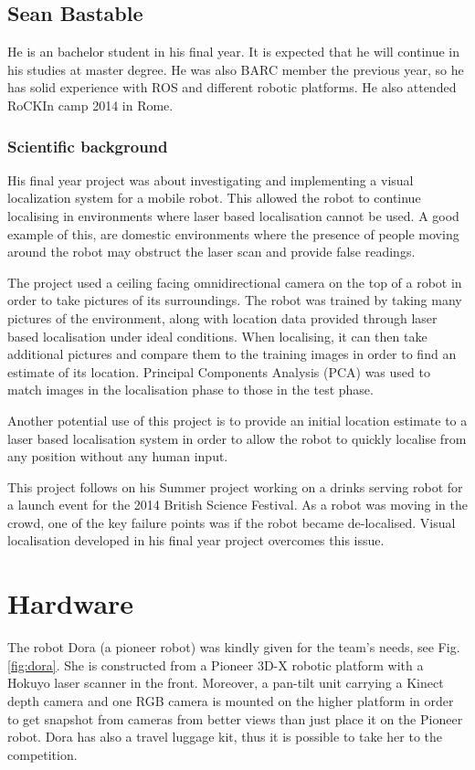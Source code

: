 \documentclass[conference]{IEEEtran}
\begin{document}
\subsection{Sean Bastable}

He is an bachelor student in his final year. It is expected that he will continue in his studies at master degree. He was also BARC member the previous year, so he has solid experience with ROS and different robotic platforms. He also attended RoCKIn camp 2014 in Rome.

\subsubsection*{Scientific background}
 
His final year project was about investigating and implementing a visual localization system for a mobile robot. This allowed the robot to continue localising in environments where laser based localisation cannot be used. A good example of this, are domestic environments where the presence of people moving around the robot may obstruct the laser scan and provide false readings.
 
The project used a ceiling facing omnidirectional camera on the top of a robot in order to take pictures of its surroundings.
The robot was trained by taking many pictures of the environment, along with location data provided through laser based localisation under ideal conditions. When localising, it can then take additional pictures and compare them to the training images in order to find an estimate of its location. Principal Components Analysis (PCA) was used to match images in the localisation phase to those in the test phase. 

Another potential use of this project is to provide an initial location estimate to a laser based localisation system in order to allow the robot to quickly localise from any position without any human input.

This project follows on his Summer project working on a drinks serving robot for a launch event for the 2014 British Science Festival. As a robot was moving in the crowd, one of the key failure points was if the robot became de-localised. Visual localisation developed in his final year project overcomes this issue.

\section{\label{sec:hardware}Hardware}
The robot Dora (a pioneer robot) was kindly given for the team's needs, see Fig.\ref{fig:dora}. She is constructed from a Pioneer 3D-X robotic platform with a Hokuyo laser scanner in the front. Moreover, a pan-tilt unit carrying a Kinect depth camera and one RGB camera
is mounted on the higher platform in order to get snapshot from cameras from better views than just place it on the Pioneer robot. Dora has also a travel luggage kit, thus it is possible to take her to the competition.
\end{document}
